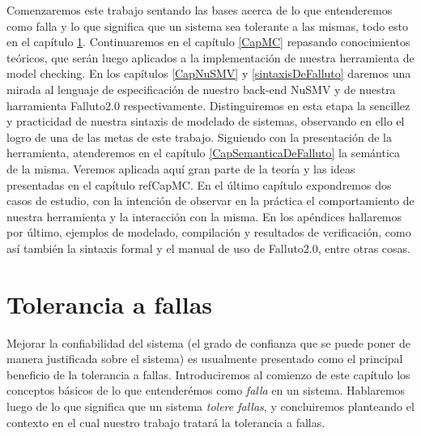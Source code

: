 \documentclass[titlepage, 12pt]{book}
\begin{document}
Comenzaremos este trabajo sentando las bases acerca de lo que entenderemos como falla y lo que significa que un sistema sea tolerante a las mismas, todo esto en el cap\'itulo \ref{CapToleranciaAFallas}. Continuaremos en el cap\'itulo \ref{CapMC} repasando conocimientos te\'oricos, que ser\'an luego aplicados a la implementaci\'on de nuestra herramienta de model checking. En los cap\'itulos \ref{CapNuSMV} y \ref{sintaxisDeFalluto} daremos una mirada al lenguaje de especificaci\'on de nuestro back-end NuSMV y de nuestra harramienta Falluto2.0 respectivamente. Distinguiremos en esta etapa la sencillez y practicidad de nuestra sintaxis de modelado de sistemas, observando en ello el logro de una de las metas de este trabajo. Siguiendo con la presentaci\'on de la herramienta, atenderemos en el cap\'itulo \ref{CapSemanticaDeFalluto} la sem\'antica de la misma. Veremos aplicada aqu\'i gran parte de la teor\'ia y las ideas presentadas en el cap\'itulo ref{CapMC}. En el \'ultimo cap\'itulo expondremos dos casos de estudio, con la intenci\'on de observar en la pr\'actica el comportamiento de nuestra herramienta y la interacci\'on con la misma. En los ap\'endices hallaremos por \'ultimo, ejemplos de modelado, compilaci\'on y resultados de verificaci\'on, como as\'i tambi\'en la sintaxis formal y el manual de uso de Falluto2.0, entre otras cosas.










\chapter{Tolerancia a fallas}
\label{CapToleranciaAFallas}
Mejorar la confiabilidad del sistema (el grado de confianza que se puede poner 
de manera justificada sobre el sistema) es usualmente presentado como el 
principal beneficio de la tolerancia a fallas. Introduciremos al comienzo de este cap\'itulo los conceptos b\'asicos de lo que entender\'emos como \textit{falla} en un sistema. Hablaremos luego de lo que significa que un sistema \textit{tolere fallas}, y concluiremos planteando el contexto en el cual nuestro trabajo tratar\'a la tolerancia a fallas.
\end{document}
